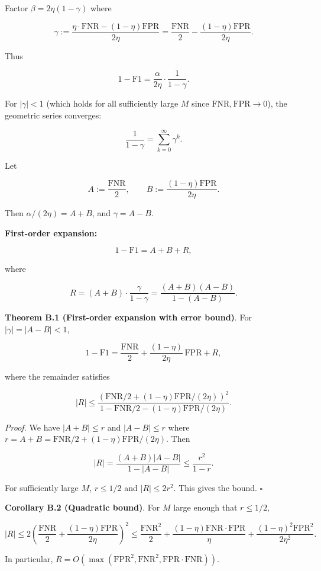 \documentclass[
  12pt,
]{article}
\begin{document}
Factor \(\beta = 2\eta(1 - \gamma)\) where

\[\gamma := \frac{\eta\cdot\text{FNR} - (1-\eta)\text{FPR}}{2\eta}
= \frac{\text{FNR}}{2} - \frac{(1-\eta)\text{FPR}}{2\eta}.\]

Thus

\[1 - \text{F1} = \frac{\alpha}{2\eta} \cdot \frac{1}{1 - \gamma}.\]

For \(|\gamma| < 1\) (which holds for all sufficiently large \(M\) since
\(\text{FNR},\text{FPR} \to 0\)), the geometric series converges:

\[\frac{1}{1 - \gamma} = \sum_{k=0}^\infty \gamma^k.\]

Let

\[A := \frac{\text{FNR}}{2}, \qquad B := \frac{(1-\eta)\text{FPR}}{2\eta}.\]

Then \(\alpha/(2\eta) = A + B\), and \(\gamma = A - B\).

\textbf{First-order expansion:}

\[1 - \text{F1} = A + B + R,\]

where

\[R = (A+B) \cdot \frac{\gamma}{1-\gamma} = \frac{(A+B)(A-B)}{1-(A-B)}.\]

\textbf{Theorem B.1 (First-order expansion with error bound)}. For
\(|\gamma| = |A-B| < 1\),

\[1 - \text{F1} = \frac{\text{FNR}}{2} + \frac{(1-\eta)}{2\eta}\,\text{FPR} + R,\]

where the remainder satisfies

\[|R| \leq \frac{(\text{FNR}/2 + (1-\eta)\text{FPR}/(2\eta))^2}
{1 - \text{FNR}/2 - (1-\eta)\text{FPR}/(2\eta)}.\]

\emph{Proof.} We have \(|A+B| \leq r\) and \(|A-B| \leq r\) where
\(r = A+B = \text{FNR}/2 + (1-\eta)\text{FPR}/(2\eta)\). Then

\[|R| = \frac{(A+B)|A-B|}{1-|A-B|} \leq \frac{r^2}{1-r}.\]

For sufficiently large \(M\), \(r \leq 1/2\) and \(|R| \leq 2r^2\). This
gives the bound. \(\square\)

\textbf{Corollary B.2 (Quadratic bound)}. For \(M\) large enough that
\(r \leq 1/2\),

\[|R| \leq 2\left(\frac{\text{FNR}}{2} + \frac{(1-\eta)\text{FPR}}{2\eta}\right)^2
\leq \frac{\text{FNR}^2}{2} + \frac{(1-\eta)\text{FNR}\cdot\text{FPR}}{\eta}
+ \frac{(1-\eta)^2\text{FPR}^2}{2\eta^2}.\]

In particular,
\(R = O(\max(\text{FPR}^2, \text{FNR}^2, \text{FPR}\cdot\text{FNR}))\).
\end{document}
